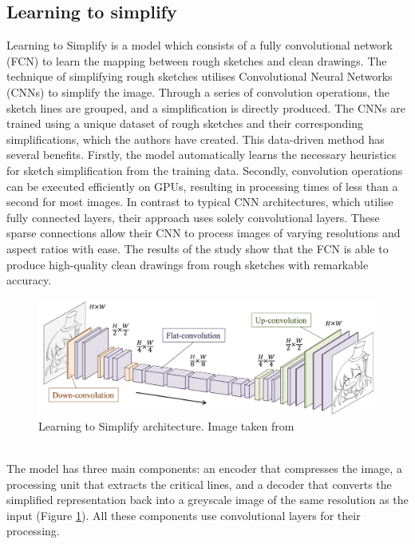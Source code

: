 \subsection{Learning to simplify}
Learning to Simplify is a model which consists of a fully convolutional network (FCN) to learn the mapping between rough sketches and clean drawings. The technique of simplifying rough sketches utilises Convolutional Neural Networks (CNNs) to simplify the image. Through a series of convolution operations, the sketch lines are grouped, and a simplification is directly produced. The CNNs are trained using a unique dataset of rough sketches and their corresponding simplifications, which the authors have created. This data-driven method has several benefits. Firstly, the model automatically learns the necessary heuristics for sketch simplification from the training data. Secondly, convolution operations can be executed efficiently on GPUs, resulting in processing times of less than a second for most images. In contrast to typical CNN architectures, which utilise fully connected layers, their approach uses solely convolutional layers. These sparse connections allow their CNN to process images of varying resolutions and aspect ratios with ease. The results of the study show that the FCN is able to produce high-quality clean drawings from rough sketches with remarkable accuracy.
\begin{figure}[h!]
\centering
  \includegraphics[scale=0.35]{figures/learnToSimplifyArchitecture.png}
  \caption{Learning to Simplify architecture. Image taken from \cite{SketchSimplify}}
  \label{fig:Learning to Simplify architecture}
\end{figure}
\\
The model has three main components: an encoder that compresses the image, a processing unit that extracts the critical lines, and a decoder that converts the simplified representation back into a greyscale image of the same resolution as the input (Figure \ref{fig:Learning to Simplify architecture}). All these components use convolutional layers for their processing.


